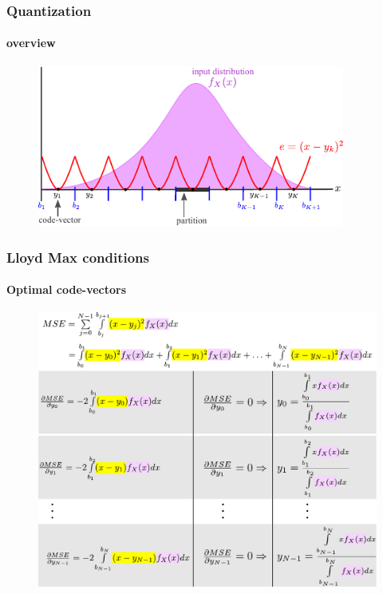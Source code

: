 \begin{frame}
\frametitle{Quantization}
\framesubtitle{overview}
\logoCSIPCPL\mypagenum
	\begin{figure}				
		\includegraphics[width=0.9\textwidth]{figs/Quantization_MSE.pdf}
	\end{figure}
\end{frame}







\begin{frame}[plain]
\frametitle{Lloyd Max conditions}
\framesubtitle{Optimal code-vectors}
\logoCSIPCPL\mypagenum
	\begin{changemargin}{-1.3in}{0in}
		\begin{figure}				
			\includegraphics[height=0.8\textheight]{figs/Quantization_optimalCodevectors.pdf}
		\end{figure}
	\end{changemargin}
\end{frame}



